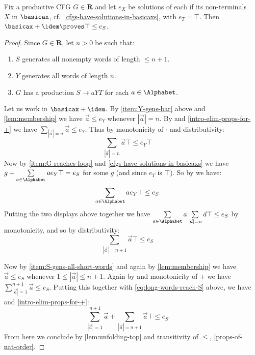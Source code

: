 \documentclass[runningheads]{amsart}
\begin{document}
\begin{proposition}
\label{reg-tot-provable-with-idem}
    Fix a productive CFG $G \in \mathbf R$ and let $e_X$ be solutions of each if its non-terminals $X$ in $\basicax$, cf.~\cref{cfgs-have-solutions-in-basicaxs}, with $e_T = \top$. 
    Then $\basicax + \idem \proves \top \leq e_S$.
\end{proposition}
\begin{proof}
Since $G\in \mathbf R$, let $n>0$ be such that:
\begin{enumerate}
    \item\label{item:S-gens-all-short-words} $S$ generates all nonempty words of length $\leq  n+1$.
    \item\label{item:Y-gens-bar} $Y$ generates all words of length $n$.
    \item\label{item:G-reaches-loop} $G$ has a production $S \to aYT$ for each $a \in \Alphabet$.
\end{enumerate}
    Let us work in $\basicax + \idem$. 
    By \eqref{item:Y-gens-bar} above and \cref{lem:membership} we have
    $ \vec a \leq e_Y$ whenever $|\vec a| = n$.
    By  and \cref{intro-elim-props-for-+} we have $\sum\limits_{|\vec a| = n}\vec a \leq e_Y $.
    Thus by monotonicity of $\cdot$ and distributivity:
    $$\sum\limits_{|\vec a| = n}\vec a \top \leq e_Y\top$$
    Now by \eqref{item:G-reaches-loop} and \cref{cfgs-have-solutions-in-basicaxs} we have $g + \sum\limits_{a \in \Alphabet}ae_Y\top = e_S$ for some $g$ (and since $e_T$ is $\top$).
    So by  we have:
    $$\sum\limits_{a \in \Alphabet} ae_Y\top \leq e_S$$
    Putting the two displays above together we have $\sum\limits_{a \in \Alphabet} a\sum\limits_{|\vec a| = n}\vec a \top \leq e_S$ by monotonicity, and so by distributivity:
    \begin{equation}
    \label{eq:long-words-reach-S}
        \sum\limits_{|\vec a| = n+1}\vec a \top \leq e_S
    \end{equation}
    
    Now by \eqref{item:S-gens-all-short-words} and again by \cref{lem:membership} we have $\vec a \leq e_S$ whenever $1 \leq |\vec a|\leq n+1$. 
    Again by  and monotonicity of $+$ we have 
    $\sum\limits_{|\vec a|=1}^{n+1} \vec a \leq e_S$.
    Putting this together with \eqref{eq:long-words-reach-S} above, we have  and \cref{intro-elim-props-for-+}:
    $$\sum\limits_{|\vec a|=1}^{n+1} \vec a  + \sum\limits_{|\vec a| = n+1}\vec a \top \leq e_S$$
    From here we conclude by \cref{lem:unfolding-top} and transitivity of $\leq$, \cref{props-of-nat-order}.
\end{proof}
\end{document}
